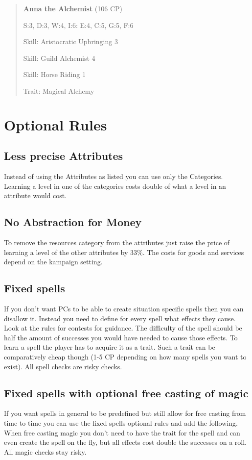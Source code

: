 \documentclass[11pt]{article}
\begin{document}
{\begin{multicols}{2}[]
\begin{quote}
\textbf{Anna the Alchemist} (106 CP)

S:3, D:3, W:4, I:6: E:4, C:5, G:5, F:6

Skill: Aristocratic Upbringing 3

Skill: Guild Alchemist 4

Skill: Horse Riding 1

Trait: Magical Alchemy
\end{quote}

\newpage
\section{Optional Rules}
\label{sec:orgbdf8ccb}

\subsection{Less precise Attributes}
\label{sec:org54c8e19}
Instead of using the Attributes as listed you can use only the Categories. Learning a level in one of the categories costs double of what a level in an attribute would cost.

\subsection{No Abstraction for Money}
\label{sec:org9e082b9}
To remove the resources category from the attributes just raise the price of learning a level of the other attributes by 33\%. The costs for goods and services depend on the kampaign setting.

\subsection{Fixed spells}
\label{sec:org26cc710}
If you don't want PCs to be able to create situation specific spells then you can disallow it. Instead you need to define for every spell what effects they cause. Look at the rules for contests for guidance. The difficulty of the spell should be half the amount of successes you would have needed to cause those effects. To learn a spell the player has to acquire it as a trait. Such a trait can be comparatively cheap though (1-5 CP depending on how many spells you want to exist). All spell checks are risky checks.

\subsection{Fixed spells with optional free casting of magic}
\label{sec:org08c7040}
If you want spells in general to be predefined but still allow for free casting from time to time you can use the fixed spells optional rules and add the following. When free casting magic you don't need to have the trait for the spell and can even create the spell on the fly, but all effects cost double the successes on a roll. All magic checks stay risky.


\end{multicols}}
\end{document}
